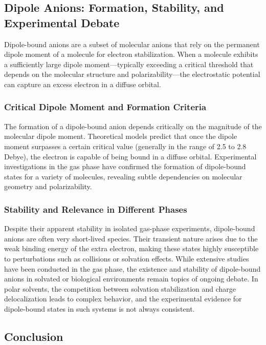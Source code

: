 \subsection{Dipole Anions: Formation, Stability, and Experimental Debate}

Dipole-bound anions are a subset of molecular anions that rely on the permanent dipole moment of a molecule for electron stabilization. When a molecule exhibits a sufficiently large dipole moment—typically exceeding a critical threshold that depends on the molecular structure and polarizability—the electrostatic potential can capture an excess electron in a diffuse orbital\cite{jordan2003theory}.

\subsubsection{Critical Dipole Moment and Formation Criteria}

The formation of a dipole-bound anion depends critically on the magnitude of the molecular dipole moment. Theoretical models predict that once the dipole moment surpasses a certain critical value (generally in the range of 2.5 to 2.8 Debye), the electron is capable of being bound in a diffuse orbital. Experimental investigations in the gas phase have confirmed the formation of dipole-bound states for a variety of molecules, revealing subtle dependencies on molecular geometry and polarizability.

\subsubsection{Stability and Relevance in Different Phases}

Despite their apparent stability in isolated gas-phase experiments, dipole-bound anions are often very short-lived species. Their transient nature arises due to the weak binding energy of the extra electron, making these states highly susceptible to perturbations such as collisions or solvation effects. While extensive studies have been conducted in the gas phase, the existence and stability of dipole-bound anions in solvated or biological environments remain topics of ongoing debate. In polar solvents, the competition between solvation stabilization and charge delocalization leads to complex behavior, and the experimental evidence for dipole-bound states in such systems is not always consistent.

\subsection{Conclusion}

